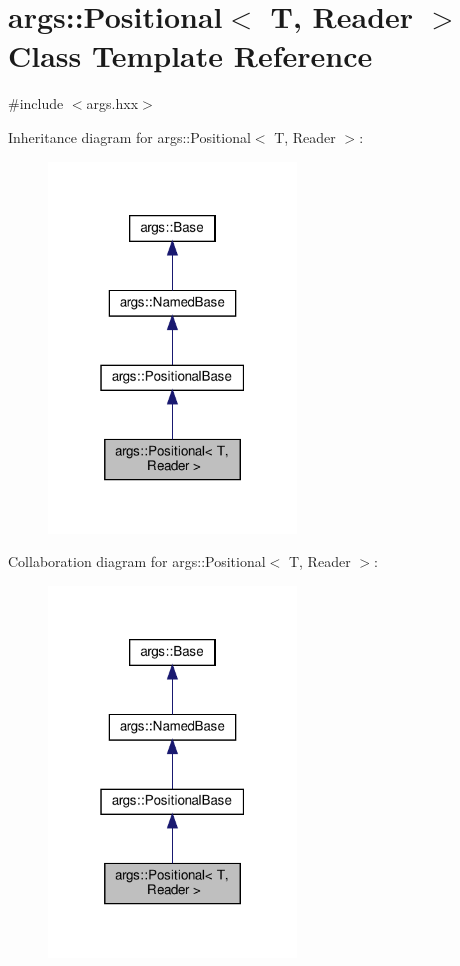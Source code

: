 \hypertarget{classargs_1_1_positional}{}\section{args\+:\+:Positional$<$ T, Reader $>$ Class Template Reference}
\label{classargs_1_1_positional}


{\ttfamily \#include $<$args.\+hxx$>$}



Inheritance diagram for args\+:\+:Positional$<$ T, Reader $>$\+:\nopagebreak
\begin{figure}[H]
\begin{center}
\leavevmode
\includegraphics[width=187pt]{classargs_1_1_positional__inherit__graph}
\end{center}
\end{figure}


Collaboration diagram for args\+:\+:Positional$<$ T, Reader $>$\+:\nopagebreak
\begin{figure}[H]
\begin{center}
\leavevmode
\includegraphics[width=187pt]{classargs_1_1_positional__coll__graph}
\end{center}
\end{figure}
